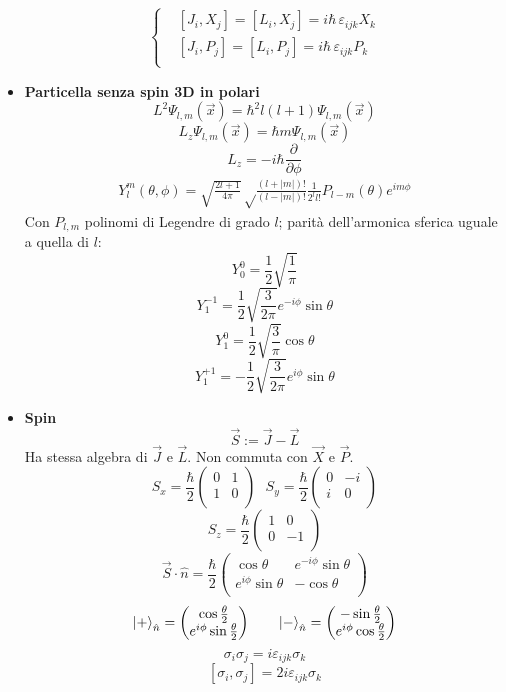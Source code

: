 \documentclass{article}
\DeclarePairedDelimiter\ket{\lvert}{\rangle}
\begin{document}
\begin{footnotesize}
\begin{multicols*}{3}
\begin{itemize}[leftmargin=*]
		\[
			\left\{\begin{aligned}
				&\left[J_i, X_j\right] = \left[L_i,X_j\right] = i\hbar \,\varepsilon _{ijk} X_k\\
				&\left[J_i, P_j\right] = \left[L_i,P_j\right] = i\hbar \,\varepsilon _{ijk} P_k\\
			\end{aligned}\right.
		\]
	\item \textbf{Particella senza spin 3D in polari}
		\[L^2 \Psi _{l,m}(\vec{x}) = \hbar ^2 l(l+1) \Psi _{l,m}(\vec{x})\]
		\[L_z \Psi _{l,m}(\vec{x}) = \hbar m \Psi _{l,m}(\vec{x})\]
		\[L_z = -i\hbar \frac{\partial}{\partial \phi }\]
		\begin{align*}Y_l^m(\theta ,\phi ) = \sqrt{\frac{2l+1}{4\pi }}\sqrt\frac{(l+|m|)!}{\left(l-|m|\right)!}\frac{1}{2^ll!}P_{l-m}(\theta ) e^{im\phi }\end{align*}
		Con $P_{l,m}$ polinomi di Legendre di grado $l$; parità dell'armonica sferica uguale a quella di $l$:
		\[Y_0^0 = \frac{1}{2}\sqrt{\frac{1}{\pi }}\]
		\[Y_1^{-1} = \frac{1}{2}\sqrt{\frac{3}{2\pi }}e^{-i\phi }\sin\theta \]
		\[Y_1^0 = \frac{1}{2}\sqrt{\frac{3}{\pi }}\cos\theta \]
		\[Y_1^{+1} = -\frac{1}{2}\sqrt{\frac{3}{2\pi }} e^{i\phi }\sin\theta \]
	\item \textbf{Spin}
		\[\vec{S} := \vec{J}-\vec{L}\]
		Ha stessa algebra di $\vec{J}$ e $\vec{L}$. Non commuta con $\vec{X}$ e $\vec{P}$.
		\[S_x = \frac{\hbar }{2}
			\begin{pmatrix}
				0&1\\
				1&0\\
			\end{pmatrix}
			\hspace{8pt}
		S_y = \frac{\hbar }{2}
			\begin{pmatrix}
				0&-i\\
				i&0\\
			\end{pmatrix}
		\]
		\[S_z = \frac{\hbar }{2}
			\begin{pmatrix}
				1&0\\
				0&-1\\
			\end{pmatrix}
		\]
		\[\vec{S}\cdot \hat{n} = \frac{\hbar }{2} \begin{pmatrix}
			\cos\theta & e^{-i\phi }\sin\theta \\
			e^{i\phi }\sin\theta & -\cos\theta \\
		\end{pmatrix}\]
		\[\ket*{+}_{\hat{n}} = \begin{pmatrix} \cos\frac{\theta }{2} \\ e^{i\phi }\sin\frac{\theta }{2}\end{pmatrix}
		\hspace{20pt} \ket*{-}_{\hat{n}} = \begin{pmatrix} -\sin\frac{\theta }{2} \\ e^{i\phi }\cos\frac{\theta }{2}\end{pmatrix}
\]
		\[\sigma _i\sigma _j = i\varepsilon _{ijk}\sigma _k\]
		\[\left[\sigma _i,\sigma _j\right] = 2i\varepsilon _{ijk}\sigma _k\]


\end{itemize}
\end{multicols*}
\end{footnotesize}
\end{document}
